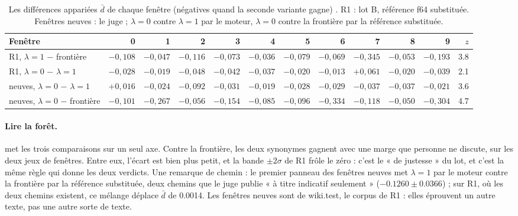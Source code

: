 \begin{table}[ht]
\centering\footnotesize
\caption[Les différences appariées, fenêtre par fenêtre]{Les différences appariées $\bar d$ de chaque fenêtre (négatives quand la seconde variante gagne) \mes. R1 : lot B, référence f64 substituée. Fenêtres neuves : le juge ; $\lambda = 0$ contre $\lambda = 1$ par le moteur, $\lambda = 0$ contre la frontière par la référence substituée.}
\label{t3sno:tab:fenetres}
\setlength{\tabcolsep}{2.6pt}
\begin{tabular}{@{}lrrrrrrrrrr|r@{}}
\toprule
Fenêtre & 0 & 1 & 2 & 3 & 4 & 5 & 6 & 7 & 8 & 9 & $z$ \\
\midrule
R1, $\lambda = 1$ − frontière & $-0{,}108$ & $-0{,}047$ & $-0{,}116$ & $-0{,}073$ & $-0{,}036$ & $-0{,}079$ & $-0{,}069$ & $-0{,}345$ & $-0{,}053$ & $-0{,}193$ & \num{3.8} \\
R1, $\lambda = 0$ − $\lambda = 1$ & $-0{,}028$ & $-0{,}019$ & $-0{,}048$ & $-0{,}042$ & $-0{,}037$ & $-0{,}020$ & $-0{,}013$ & $+0{,}061$ & $-0{,}020$ & $-0{,}039$ & \num{2.1} \\
neuves, $\lambda = 0$ − $\lambda = 1$ & $+0{,}016$ & $-0{,}024$ & $-0{,}092$ & $-0{,}031$ & $-0{,}019$ & $-0{,}028$ & $-0{,}029$ & $-0{,}037$ & $-0{,}037$ & $-0{,}021$ & \num{3.6} \\
neuves, $\lambda = 0$ − frontière & $-0{,}101$ & $-0{,}267$ & $-0{,}056$ & $-0{,}154$ & $-0{,}085$ & $-0{,}096$ & $-0{,}334$ & $-0{,}118$ & $-0{,}050$ & $-0{,}304$ & \num{4.7} \\
\bottomrule
\end{tabular}
\end{table}

\begin{figure}[tbp]
\centering
\GrapheSynoForet
{}
\label{fig:t3-syno-foret}
\end{figure}

\paragraph{Lire la forêt.}  met les trois comparaisons sur un seul axe. Contre la frontière, les deux synonymes gagnent avec une marge que personne ne discute, sur les deux jeux de fenêtres. Entre eux, l'écart est bien plus petit, et la bande $\pm 2\sigma$ de R1 frôle le zéro : c'est le « de justesse » du lot, et c'est la même règle qui donne les deux verdicts. Une remarque de chemin : le premier panneau des fenêtres neuves met $\lambda = 1$ par le moteur contre la frontière par la référence substituée, deux chemins que le juge publie « à titre indicatif seulement » ($-\num{0.1260} \pm \num{0.0366}$) ; sur R1, où les deux chemins existent, ce mélange déplace $\bar d$ de \num{0.0014}. Les fenêtres neuves sont de wiki.test, le corpus de R1 \parencite{merity2016wikitext} : elles éprouvent un autre texte, pas une autre sorte de texte.

